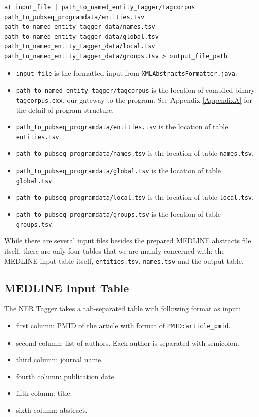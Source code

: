 \begin{lstlisting}[breaklines]
at input_file | path_to_named_entity_tagger/tagcorpus path_to_pubseq_programdata/entities.tsv path_to_named_entity_tagger_data/names.tsv path_to_named_entity_tagger_data/global.tsv path_to_named_entity_tagger_data/local.tsv path_to_named_entity_tagger_data/groups.tsv > output_file_path
\end{lstlisting}

\begin{itemize}
\item \texttt{input\_file} is the formatted input from \texttt{XMLAbstractsFormatter.java}.
\item \texttt{path\_to\_named\_entity\_tagger/tagcorpus} is the location of compiled binary \texttt{tagcorpus.cxx}, our gateway to the program. See Appendix \ref{AppendixA} for the detail of program structure.
\item \texttt{path\_to\_pubseq\_programdata/entities.tsv} is the location of table \texttt{entities.tsv}.
\item \texttt{path\_to\_pubseq\_programdata/names.tsv} is the location of table \texttt{names.tsv}.
\item \texttt{path\_to\_pubseq\_programdata/global.tsv} is the location of table \texttt{global.tsv}.
\item \texttt{path\_to\_pubseq\_programdata/local.tsv} is the location of table \texttt{local.tsv}.
\item \texttt{path\_to\_pubseq\_programdata/groups.tsv} is the location of table \texttt{groups.tsv}.
\end{itemize}

While there are several input files besides the prepared MEDLINE abstracts file itself, there are only four tables that we are mainly concerned with: the MEDLINE input table itself, \texttt{entities.tsv}, \texttt{names.tsv} and the output table.

\subsection{MEDLINE Input Table}

The NER Tagger takes a tab-separated table with following format as input:

\begin{itemize}
\item first column: PMID of the article with format of \texttt{PMID:article\_pmid}.
\item second column: list of authors. Each author is separated with semicolon.
\item third column: journal name.
\item fourth column: publication date.
\item fifth column: title.
\item sixth column: abstract.
\end{itemize}

